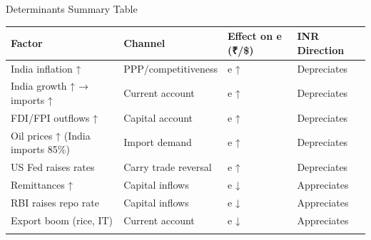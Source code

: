 \documentclass[
  ignorenonframetext,
  aspectratio=169,
]{beamer}
\makeatletter
\let\quarto@originallabel\label
\DeclareRobustCommand*{\label}[1]{\quarto@originallabel{#1}}
\makeatother
\begin{document}
\begin{frame}{Determinants Summary Table}
\label{determinants-summary-table}
\begin{longtable}[]{@{}llll@{}}
\toprule\noalign{}
Factor & Channel & Effect on e (₹/\$) & INR Direction \\
\midrule\noalign{}
\endhead
India inflation ↑ & PPP/competitiveness & e ↑ & Depreciates \\
India growth ↑ → imports ↑ & Current account & e ↑ & Depreciates \\
FDI/FPI outflows ↑ & Capital account & e ↑ & Depreciates \\
Oil prices ↑ (India imports 85\%) & Import demand & e ↑ & Depreciates \\
US Fed raises rates & Carry trade reversal & e ↑ & Depreciates \\
Remittances ↑ & Capital inflows & e ↓ & Appreciates \\
RBI raises repo rate & Capital inflows & e ↓ & Appreciates \\
Export boom (rice, IT) & Current account & e ↓ & Appreciates \\
\bottomrule\noalign{}
\end{longtable}

\end{frame}
\end{document}
